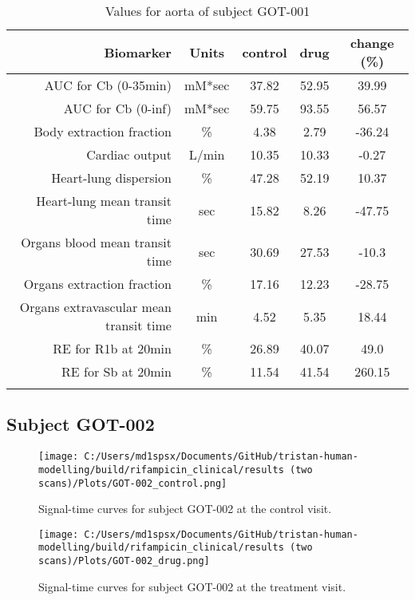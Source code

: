 \documentclass{epflreport}%
\begin{document}
\begin{longtable}{rcccc}%
\hline%
Biomarker&Units&control&drug&change (\%)\\%
\hline%
AUC for Cb (0{-}35min)&mM*sec&37.82&52.95&39.99\\%
AUC for Cb (0{-}inf)&mM*sec&59.75&93.55&56.57\\%
Body extraction fraction&\%&4.38&2.79&{-}36.24\\%
Cardiac output&L/min&10.35&10.33&{-}0.27\\%
Heart{-}lung dispersion&\%&47.28&52.19&10.37\\%
Heart{-}lung mean transit time&sec&15.82&8.26&{-}47.75\\%
Organs blood mean transit time&sec&30.69&27.53&{-}10.3\\%
Organs extraction fraction&\%&17.16&12.23&{-}28.75\\%
Organs extravascular mean transit time&min&4.52&5.35&18.44\\%
RE for R1b at 20min&\%&26.89&40.07&49.0\\%
RE for Sb at 20min&\%&11.54&41.54&260.15\\%
\hline%
\caption{Values for aorta of subject GOT-001} \\%
\end{longtable}%
\clearpage%
\subsection{Subject GOT{-}002}%
\label{subsec:SubjectGOT{-}002}%

%


\begin{figure}[h!]%
\centering%
\texttt{[image: C:/Users/md1spsx/Documents/GitHub/tristan-human-modelling/build/rifampicin\_clinical/results (two scans)/Plots/GOT-002\_control.png]}%
\caption{Signal{-}time curves for subject GOT{-}002 at the control visit.}%
\end{figure}

%


\begin{figure}[h!]%
\centering%
\texttt{[image: C:/Users/md1spsx/Documents/GitHub/tristan-human-modelling/build/rifampicin\_clinical/results (two scans)/Plots/GOT-002\_drug.png]}%
\caption{Signal{-}time curves for subject GOT{-}002 at the treatment visit.}%
\end{figure}
\end{document}
